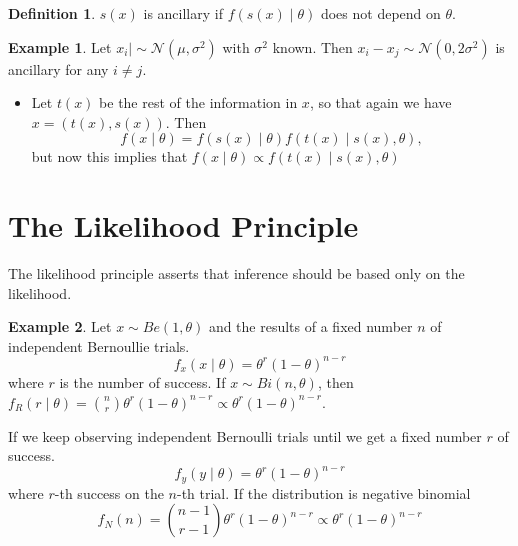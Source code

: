 \documentclass[lecture,12pt,]{pcms-l}
\numberwithin{section}{chapter}
\numberwithin{equation}{chapter}
\theoremstyle{plain}
\theoremstyle{definition}
\newtheorem{example}{Example}[section]
\theoremstyle{definition}
\newtheorem{definition}[equation]{Definition}
\begin{document}
\begin{definition}
$s(x)$ is ancillary if $f(s(x)\mid \theta)$ does not depend on $\theta$.
\end{definition}

\begin{example}
Let $x_i \mid \sim \mathcal{N}(\mu, \sigma^2)$ with $\sigma^2$ known. Then $x_i-x_j \sim \mathcal{N}(0,2\sigma^2)$ is ancillary for any $i \neq j$. 
\end{example}
\begin{itemize}
\item Let $t(x)$ be the rest of the information in $x$, so that again we have $x=(t(x),s(x))$. Then 
\begin{equation}
f(x \mid \theta)=f(s(x) \mid \theta)f(t(x)\mid s(x), \theta),
\end{equation}
but now this implies that $f(x \mid \theta) \propto f(t(x)\mid s(x), \theta)$
\end{itemize}
\section{The Likelihood Principle}
The likelihood principle asserts that inference should be based only on the likelihood.

\begin{example}
Let $x \sim Be(1, \theta)$ and the results of a fixed number $n$ of independent Bernoullie trials.
\begin{equation}
f_x(x \mid \theta)= \theta^r (1-\theta)^{n-r}
\end{equation}
where $r$ is the number of success. If $x \sim Bi(n,\theta)$, then $f_R (r \mid \theta)= \binom{n}{r}\theta^r (1-\theta)^{n-r} \propto \theta^r (1-\theta)^{n-r}$.

If we keep observing independent Bernoulli trials until we get a fixed number $r$ of success.
\begin{equation}
f_y(y \mid \theta)=\theta^r (1-\theta)^{n-r}
\end{equation}
where $r$-th success on the $n$-th trial. If the distribution is negative binomial 
\begin{equation}
f_N(n)=\binom{n-1}{r-1}\theta^r (1 -\theta)^{n-r} \propto \theta^r (1-\theta)^{n-r}
\end{equation}
\end{example}
\end{document}
